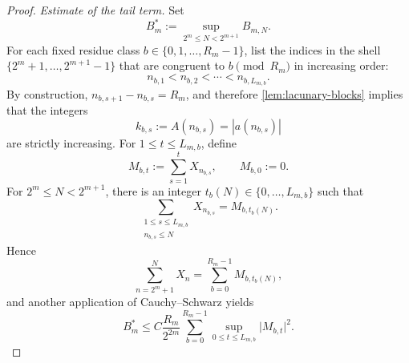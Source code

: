 \documentclass[11pt]{amsart}
\numberwithin{equation}{section}
\theoremstyle{remark}
\begin{document}
\begin{proof}
\smallskip \noindent\emph{Estimate of the tail term.} Set 
\begin{equation*}
B_m^*:=\sup_{2^m\le N<2^{m+1}}B_{m,N}. 
\end{equation*}
For each fixed residue class $b\in\{0,1,\dots,R_m-1\}$, list the indices in
the shell $\{2^m+1,\dots,2^{m+1}-1\}$ that are congruent to $b\pmod{R_m}$ in
increasing order: 
\begin{equation*}
n_{b,1}<n_{b,2}<\cdots<n_{b,L_{m,b}}. 
\end{equation*}
By construction, $n_{b,s+1}-n_{b,s}=R_m$, and therefore %
\cref{lem:lacunary-blocks} implies that the integers 
\begin{equation*}
k_{b,s}:=A(n_{b,s})=|a(n_{b,s})| 
\end{equation*}
are strictly increasing. For $1\le t\le L_{m,b}$, define 
\begin{equation*}
M_{b,t}:=\sum_{s=1}^t X_{n_{b,s}}, \qquad M_{b,0}:=0. 
\end{equation*}
For $2^m\le N<2^{m+1}$, there is an integer $t_b(N)\in\{0,\dots,L_{m,b}\}$
such that 
\begin{equation*}
\sum_{\substack{ 1\le s\le L_{m,b} \\ n_{b,s}\le N}}%
X_{n_{b,s}}=M_{b,t_b(N)}. 
\end{equation*}
Hence 
\begin{equation*}
\sum_{n=2^m+1}^{N}X_n=\sum_{b=0}^{R_m-1}M_{b,t_b(N)}, 
\end{equation*}
and another application of Cauchy--Schwarz yields 
\begin{equation*}
B_m^* \le C\frac{R_m}{2^{2m}}\sum_{b=0}^{R_m-1} \sup_{0\le t\le
L_{m,b}}\lvert M_{b,t}\rvert^2. 
\end{equation*}


\end{proof}
\end{document}
